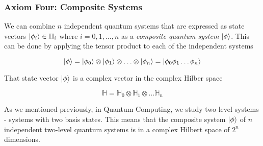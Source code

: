 \subsubsection{Axiom Four: Composite Systems}

We can combine $n$ independent quantum systems that are expressed as state vectors $\ket{\phi_i}\in\mathbb{H}_i$ where
$i=0,1,\hdots,n$ as a \textit{composite quantum system} $\ket{\phi}$. This can be done by applying the tensor product
to each of the independent systems

\begin{equation}
    \ket{\phi} = \ket{\phi_0}\otimes\ket{\phi_1}\otimes\hdots\otimes\ket{\phi_n}=\ket{\phi_0\phi_1\hdots\phi_n}
\end{equation}

That state vector $\ket{\phi}$ is a complex vector in the complex Hilber space

\begin{equation}
    \mathbb{H}=\mathbb{H}_0\otimes\mathbb{H}_1\otimes\hdots\mathbb{H}_n
\end{equation}

As we mentioned previously, in Quantum Computing, we study two-level systems - systems with two basis states.
This means that the composite system $\ket{\phi}$ of $n$ independent two-level quantum systems
is in a complex Hilbert space of $2^n$ dimensions.